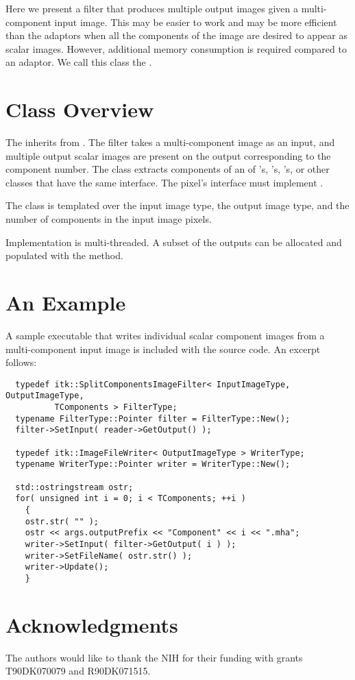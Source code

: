 \documentclass{InsightArticle}
\begin{document}
Here we present a filter that produces multiple output images given a
multi-component input image.  This may be easier to work and may be more efficient
than the adaptors when all the components of the image are desired to appear as
scalar images.  However, additional memory consumption is required compared to
an adaptor.  We call this class the .

\section{Class Overview}

The  inherits from
.  The filter takes a multi-component image as an
input, and multiple output scalar images are present on the output corresponding
to the component number.  The class extracts components of an  of
's, 's,
's, or other classes that have the same
interface.  The pixel's interface must implement .

The class is templated over the input image type, the output image type, and the
number of components in the input image pixels.

Implementation is multi-threaded.  A subset of the outputs can be allocated and
populated with the  method.

\section{An Example}

A sample executable that writes individual scalar component images from a
multi-component input image is included with the source code.  An excerpt
follows:

\begin{verbatim}
  typedef itk::SplitComponentsImageFilter< InputImageType, OutputImageType,
          TComponents > FilterType;
  typename FilterType::Pointer filter = FilterType::New();
  filter->SetInput( reader->GetOutput() );

  typedef itk::ImageFileWriter< OutputImageType > WriterType;
  typename WriterType::Pointer writer = WriterType::New();

  std::ostringstream ostr;
  for( unsigned int i = 0; i < TComponents; ++i )
    {
    ostr.str( "" );
    ostr << args.outputPrefix << "Component" << i << ".mha";
    writer->SetInput( filter->GetOutput( i ) );
    writer->SetFileName( ostr.str() );
    writer->Update();
    }
\end{verbatim}

\section{Acknowledgments}

The authors would like to thank the NIH for their funding with grants
T90DK070079 and R90DK071515.
\end{document}

